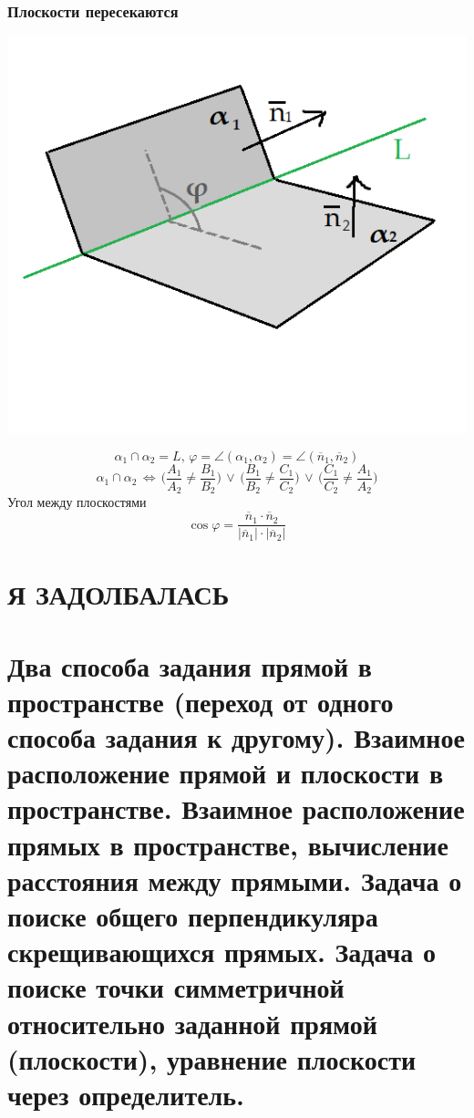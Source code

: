 \documentclass{article}
\begin{document}
\subsubsection{Плоскости пересекаются}
\begin{center}
    \includegraphics[scale=0.4]{pic7.png}
\end{center}
$$ \alpha_1\cap\alpha_2=L,\,\varphi=\angle(\alpha_1,\alpha_2)=\angle(\overline{n}_1,\overline{n}_2) $$
$$ \alpha_1\cap\alpha_2\,\Leftrightarrow\,\bigg(\frac{A_1}{A_2}\neq\frac{B_1}{B_2}\bigg)\,\lor\,\bigg(\frac{B_1}{B_2}\neq\frac{C_1}{C_2}\bigg)\,\lor\,\bigg(\frac{C_1}{C_2}\neq\frac{A_1}{A_2}\bigg) $$
Угол между плоскостями
$$ \cos\varphi=\frac{\overline{n}_1\cdot\overline{n}_2}{|\overline{n}_1|\cdot|\overline{n}_2|} $$
\newpage
\section{Я ЗАДОЛБАЛАСЬ}
\newpage
\section{Два способа задания прямой в пространстве (переход от одного способа задания к другому). Взаимное расположение прямой и плоскости в пространстве. Взаимное расположение прямых в пространстве, вычисление расстояния между прямыми. Задача о поиске общего перпендикуляра скрещивающихся прямых. Задача о поиске точки симметричной относительно заданной прямой (плоскости), уравнение плоскости через определитель.}
\end{document}
